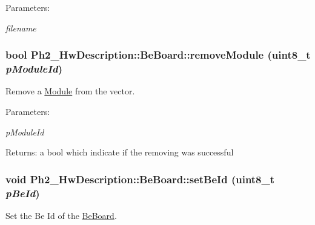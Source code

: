 \begin{Desc}
\item[Parameters:]
\begin{description}
\item[{\em filename}]\end{description}
\end{Desc}
\hypertarget{class_ph2___hw_description_1_1_be_board_ba02e7319c8c41b569c583bfa2068215}{
\subsubsection[removeModule]{\setlength{\rightskip}{0pt plus 5cm}bool Ph2\_\-Hw\-Description::Be\-Board::remove\-Module (uint8\_\-t {\em p\-Module\-Id})}}
\label{class_ph2___hw_description_1_1_be_board_ba02e7319c8c41b569c583bfa2068215}


Remove a \hyperlink{class_ph2___hw_description_1_1_module}{Module} from the vector. 

\begin{Desc}
\item[Parameters:]
\begin{description}
\item[{\em p\-Module\-Id}]\end{description}
\end{Desc}
\begin{Desc}
\item[Returns:]a bool which indicate if the removing was successful \end{Desc}
\hypertarget{class_ph2___hw_description_1_1_be_board_d96f8aff122cccb9b01a4a57b6db5440}{
\subsubsection[setBeId]{\setlength{\rightskip}{0pt plus 5cm}void Ph2\_\-Hw\-Description::Be\-Board::set\-Be\-Id (uint8\_\-t {\em p\-Be\-Id})}}
\label{class_ph2___hw_description_1_1_be_board_d96f8aff122cccb9b01a4a57b6db5440}


Set the Be Id of the \hyperlink{class_ph2___hw_description_1_1_be_board}{Be\-Board}. 

